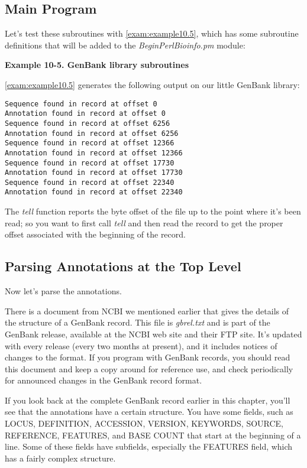 \subsection{Main Program}
Let's test these subroutines with \autoref{exam:example10.5}, which has some subroutine definitions that will be added to the \textit{BeginPerlBioinfo.pm} module:
  
\textbf{Example 10-5. GenBank library subroutines}


\autoref{exam:example10.5} generates the following output on our little GenBank library:

\begin{lstlisting}
Sequence found in record at offset 0
Annotation found in record at offset 0
Sequence found in record at offset 6256
Annotation found in record at offset 6256
Sequence found in record at offset 12366
Annotation found in record at offset 12366
Sequence found in record at offset 17730
Annotation found in record at offset 17730
Sequence found in record at offset 22340
Annotation found in record at offset 22340
\end{lstlisting}

The \textit{tell} function reports the byte offset of the file up to the point where it's been read; so you want to first call \textit{tell} and then read the record to get the proper offset associated with the beginning of the record. 

\subsection{Parsing Annotations at the Top Level}
Now let's parse the annotations.

There is a document from NCBI we mentioned earlier that gives the details of the structure of a GenBank record. This file is \textit{gbrel.txt} and is part of the GenBank release, available at the NCBI web site and their FTP site. It's updated with every release (every two months at present), and it includes notices of changes to the format. If you program with GenBank records, you should read this document and keep a copy around for reference use, and check periodically for announced changes in the GenBank record format.

If you look back at the complete GenBank record earlier in this chapter, you'll see that the annotations have a certain structure. You have some fields, such as LOCUS, DEFINITION, ACCESSION, VERSION, KEYWORDS, SOURCE, REFERENCE, FEATURES, and BASE COUNT that start at the beginning of a line. Some of these fields have subfields, especially the FEATURES field, which has a fairly complex structure.

